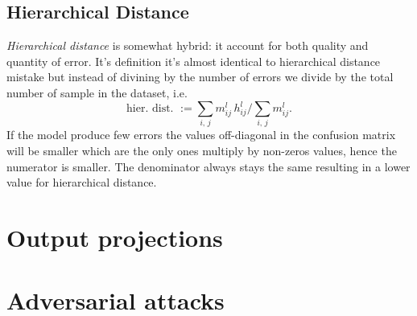\subsection{Hierarchical Distance}
\label{subsec:hierarchical-distance}
\emph{Hierarchical distance} is somewhat hybrid: it account for both quality and
quantity of error. It's definition it's almost identical to hierarchical
distance mistake but instead of divining by the number of errors we divide by
the total number of sample in the dataset, i.e.
\begin{equation}
  \textrm{hier.\ dist.\ } :=
  \sum_{i, \, j} m_{ij}^l \, h_{ij}^l \bigg/ \sum_{i, \, j} m_{ij}^l.
  \label{eq:hierarchical-distance}
\end{equation}
If the model produce few errors the values off-diagonal in the confusion matrix
will be smaller which are the only ones multiply by non-zeros values, hence the
numerator is smaller. The denominator always stays the same resulting in a lower
value for hierarchical distance.

\section{Output projections}
\label{sec:output-projections}

\section{Adversarial attacks}
\label{sec:adversarial-attacks}

%
